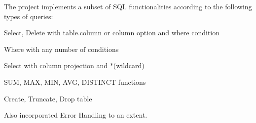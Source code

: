 The project implements a subset of S\+QL functionalities according to the following types of queries\+:


\begin{DoxyItemize}
\item Select, Delete with table.\+column or column option and where condition
\item Where with any number of conditions
\item Select with column projection and $\ast$(wildcard)
\item S\+UM, M\+AX, M\+IN, A\+VG, D\+I\+S\+T\+I\+N\+CT functions
\item Create, Truncate, Drop table
\end{DoxyItemize}

Also incorporated Error Handling to an extent. 